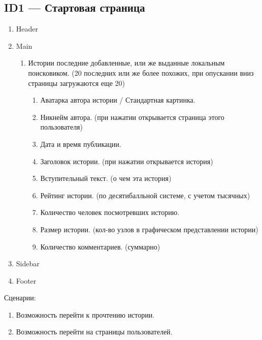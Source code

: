 \documentclass[a4paper]{article}
\begin{document}
		\subsection{ID1 --- Стартовая страница}
			\begin{enumerate}
				\item Header
				\item Main
				\begin{enumerate}
					\item Истории последние добавленные, или же выданные локальным поисковиком. (20 последних или же более похожих, при опускании вниз страницы загружаются еще 20)
					\begin{enumerate}
						\item Аватарка автора истории / Стандартная картинка.
						\item Никнейм автора. (при нажатии открывается страница этого пользователя)
						\item Дата и время публикации.
						\item Заголовок истории. (при нажатии открывается история)
						\item Вступительный текст. (о чем эта история)
						\item Рейтинг истории. (по десятибалльной системе, с учетом тысячных)
						\item Количество человек посмотревших историю.
						\item Размер истории. (кол-во узлов в графическом представлении истории)
						\item Количество комментариев. (суммарно)
					\end{enumerate}
				\end{enumerate}
				\item Sidebar
				\item Footer
			\end{enumerate}
			\large{Сценарии:}
				\begin{enumerate}
					\item Возможность перейти к прочтению истории.
					\item Возможность перейти на страницы пользователей.
				\end{enumerate}
		\newpage
\end{document}
